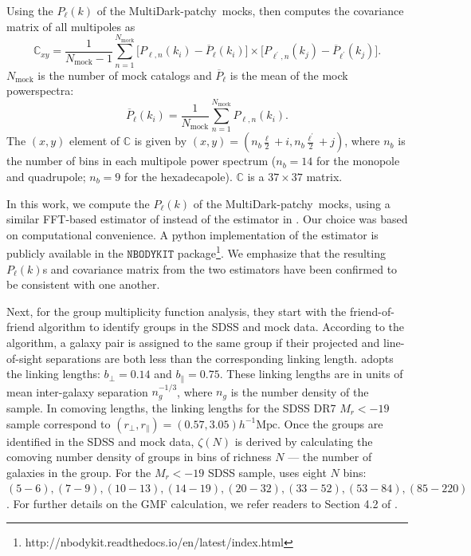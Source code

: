 \documentclass[12pt, letterpaper, preprint]{aastex}
\newcommand{\beq}{\begin{equation}}
\newcommand{\eeq}{\end{equation}}
\newcommand{\patchy}{{\fontshape\scdefault\selectfont patchy}}
\begin{document}
Using the $P_\ell(k)$ of the MultiDark-\patchy~mocks, \cite{beutler2017}
then computes the covariance matrix of all multipoles as 
\beq
\mathbb{C}_{xy} = \frac{1}{N_\mathrm{mock} - 1} \sum\limits_{n=1}^{N_\mathrm{mock}} \big[ P_{\ell,n}(k_i) - \overline{P}_\ell(k_i) \big]
    \times \big[ P_{\ell^{'},n}(k_j) - \overline{P}_{\ell^{'}}(k_j) \big].
\eeq
$N_\mathrm{mock}$ is the number of mock catalogs and $\overline{P}_\ell$ is
the mean of the mock powerspectra: 
\beq
\overline{P}_\ell(k_i) = \frac{1}{N_\mathrm{mock}} \sum\limits_{n=1}^{N_\mathrm{mock}} P_{\ell, n}(k_i). 
\eeq
The $(x,y)$ element of $\mathbb{C}$ is given by 
$(x,y) = (n_b\frac{\ell}{2} + i, n_b\frac{\ell^{'}}{2} + j)$, where 
$n_b$ is the number of bins in each multipole power spectrum ($n_b = 14$ for the 
monopole and quadrupole; $n_b = 9$ for the hexadecapole). $\mathbb{C}$ is a $37 \times 37$ 
matrix. 

In this work, we compute the $P_\ell(k)$ of the MultiDark-\patchy~mocks, 
using a similar FFT-based estimator of \cite{hand2017a} instead
of the estimator in \cite{beutler2017}. Our choice was based on 
computational convenience. A python implementation
of the \cite{hand2017a} estimator is publicly available in the $\mathtt{NBODYKIT}$ 
package\footnote{http://nbodykit.readthedocs.io/en/latest/index.html}. 
We emphasize that the resulting $P_\ell(k)$s and covariance matrix from 
the two estimators have been confirmed to be consistent with one another. 

Next, for the \cite{sinha2017a} group multiplicity function analysis, 
they start with the \cite{berlind2006} friend-of-friend algorithm to 
identify groups in the SDSS and mock data. According to the algorithm, a 
galaxy pair is assigned to the same group if their projected and line-of-sight 
separations are both less than the corresponding linking length. \cite{sinha2017a} 
adopts the \cite{berlind2006} linking lengths: $b_\perp = 0.14$ and $b_\parallel = 0.75$.
These linking lengths are in units of  mean inter-galaxy separation 
$n_g^{-1/3}$, where $n_g$ is the number density of the sample. In comoving
lengths, the linking lengths for the SDSS DR7 $M_r < -19$ sample correspond to
$(r_\perp, r_\parallel) = (0.57, 3.05)h^{-1}\mathrm{Mpc}$. 
Once the groups are identified in the SDSS and mock data, $\zeta(N)$
is derived by calculating the comoving number density of groups 
in bins of richness $N$ --- the number of galaxies in the group. 
For the $M_r < −19$ SDSS sample, \cite{sinha2017a} uses eight $N$ bins: 
$(5 - 6), (7 - 9), (10 - 13), (14 - 19), (20 - 32), (33 - 52), (53 - 84), (85 - 220)$.
For further details on the GMF calculation, we refer readers to Section 4.2
of \cite{sinha2017a}. 
\end{document}
